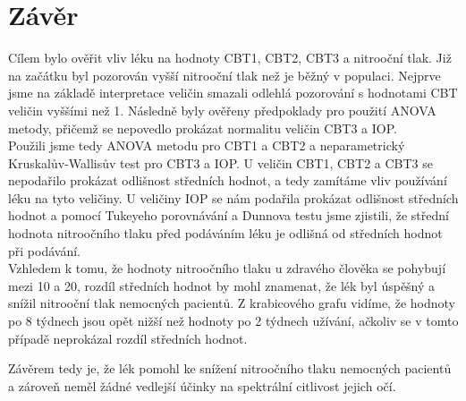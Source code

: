 \documentclass{article}
\begin{document}
\newpage
\section{Závěr}
Cílem bylo ověřit vliv léku na hodnoty CBT1, CBT2, CBT3 a nitrooční tlak.
Již na začátku byl pozorován vyšší nitrooční tlak než je běžný v populaci.
Nejprve jsme na základě interpretace veličin smazali odlehlá pozorování s hodnotami CBT veličin vyššími než 1.
Následně byly ověřeny předpoklady pro použití ANOVA metody, přičemž se nepovedlo prokázat normalitu veličin CBT3 a IOP.\\
Použili jsme tedy ANOVA metodu pro CBT1 a CBT2 a neparametrický Kruskalův-Wallisův test pro CBT3 a IOP.
U veličin CBT1, CBT2 a CBT3 se nepodařilo prokázat odlišnost středních hodnot, a tedy zamítáme vliv používání léku na tyto veličiny.
U veličiny IOP se nám podařila prokázat odlišnost středních hodnot a pomocí Tukeyeho porovnávání a Dunnova testu jsme zjistili, že střední hodnota nitroočního tlaku před podáváním léku
je odlišná od středních hodnot při podávání.\\
Vzhledem k tomu, že hodnoty nitroočního tlaku u zdravého člověka se pohybují mezi 10 a 20, rozdíl středních hodnot by mohl znamenat, že lék byl úspěšný a snížil nitrooční tlak nemocných pacientů.
Z krabicového grafu vidíme, že hodnoty po 8 týdnech jsou opět nižší než hodnoty po 2 týdnech užívání, ačkoliv se v tomto případě neprokázal rozdíl středních hodnot.

Závěrem tedy je, že lék pomohl ke snížení nitroočního tlaku nemocných pacientů a zároveň neměl žádné vedlejší účinky na spektrální citlivost jejich očí.
\end{document}
